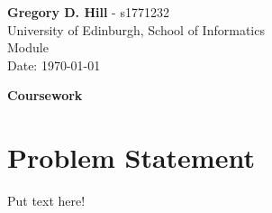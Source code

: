\documentclass[a4paper, 11pt]{article}
\begin{document}

\noindent
\large\textbf{Gregory D. Hill} - s1771232 \\
University of Edinburgh, School of Informatics \\
Module \\
Date: \today

\begin{center}\LARGE\textbf{Coursework}\end{center} 

\section*{Problem Statement}
Put text here!
\end{document}
